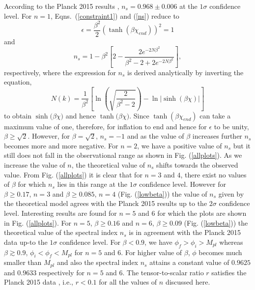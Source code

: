 \documentclass[prd,twocolumn,superscriptaddress]{revtex4}
\begin{document}
 
According to the Planck 2015 results \cite{planck2015}, $n_s = 0.968 \pm 0.006$ at the $1 \sigma$ confidence level.  For $n=1$,
Eqns.~(\ref{constraint1}) and (\ref{ns}) reduce to
\begin{equation}
 \epsilon = \frac{\beta^2}{2} {\left( \tanh \left( \beta \chi_{end} \right) \right)}^2 = 1
\end{equation}
and
\begin{equation}
 n_s= 1 - \beta^2 \left[ 2 - \frac{2 e^{- 2 N \beta^2}}{\beta^2 - 2 + 2 e^{-2 N \beta^2}} \right],
\end{equation}
respectively, where the  expression for $n_s$ is derived analytically by inverting the equation,
\begin{equation}
 N(k) = \frac{1}{\beta^2}
 \left[ \ln \left( \sqrt{\frac{2}{\beta^2 - 2}} \right)
- \ln \left| \sinh \left( \beta \chi \right) \right| \right]
\end{equation}
to obtain $\sinh{(\beta \chi})$ and hence $\tanh{(\beta \chi})$. Since $\tanh{(\beta \chi_{end})}$ can take a maximum value of one,
therefore, for inflation to end and  hence for $\epsilon$ to be unity, $\beta \geq \sqrt{2}$. However, for $\beta = \sqrt{2}$,
$n_s=-1$ and as the value of $\beta$ increases further $n_s$ becomes more and more negative.
 For $n=2$, we have a positive value of $n_s$ but it still does not fall in the observational range as shown
in Fig. (\ref{allplots}).  As we increase the value of $n$, the theoretical value of $n_s$ shifts towards the observed value.
From  Fig. (\ref{allplots}) it is clear that for $n = 3$ and  $4$, there exist no values of $\beta$ for which $n_s$ lies in this
range at the $1 \sigma$ confidence level. However for $\beta \geq 0.17$, $n = 3$ and $\beta \geq 0.085$, $n = 4$ (Fig. (\ref{lowbeta})) the value
of $n_s$ given by the theoretical model agrees with the Planck 2015 results up to the
$2 \sigma$ confidence level. Interesting results are found for $n=5$ and $6$ for which the plots
are shown in   Fig. (\ref{allplots}). For $n=5$, $\beta \geq 0.16$  and
$n=6$, $\beta \geq 0.09$ (Fig. (\ref{lowbeta})) the theoretical value of the spectral index $n_s$ is in  agreement with the Planck 2015 data
 up-to the $1 \sigma$ confidence level. For $\beta < 0.9$, we have $\phi_f > \phi_i > M_{pl}$ whereas
$\beta \gtrsim 0.9$,  $\phi_i < \phi_f < M_{pl}$ for $n=5$ and $6$. For higher value of $\beta$, $\phi$ becomes much smaller than
 $M_{pl}$ and also the spectral index $n_s$ attains a constant value of $0.9625$
and $0.9633$ respectively for $n=5$ and $6$. The tensor-to-scalar ratio $r$  satisfies the Planck
2015 data \cite{planck2015}, i.e., $r<0.1$  for all the values of $n$ discussed here. \\
\end{document}
